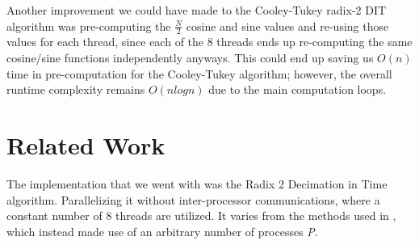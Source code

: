 \documentclass[journal]{IEEEtran}
\begin{document}
	\par{
		Another improvement we could have made to the Cooley-Tukey radix-2 DIT
		algorithm was pre-computing the $\frac{N}{2}$ cosine and sine values and
		re-using those values for each thread, since each of the 8 threads ends 
		up re-computing the same cosine/sine functions independently anyways.
		This could end up saving us $O(n)$ time in pre-computation for the 
		Cooley-Tukey algorithm; however, the overall runtime complexity 
		remains $O(nlogn)$ due to the main computation loops.
	}

\section{Related Work}\label{RelatedWork}
	\par{
		The implementation that we went with was the Radix 2 Decimation in Time algorithm. Parallelizing it without 
		inter-processor communications, where a constant number of 8 threads are utilized. It varies from the 
		methods used in \cite{Xie}, which instead made use of an arbitrary number of processes \textit{P}. 
	}
\end{document}
